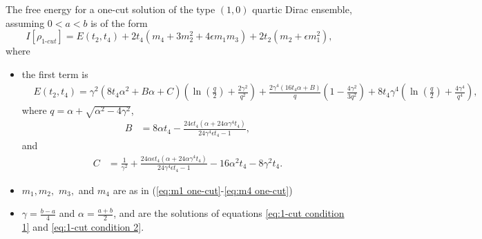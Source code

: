 \documentclass[10pt,a4paper]{amsart}
\begin{document}
\begin{prop}\label{free energy theorem}
 	The free energy for a one-cut solution of the type $(1,0)$ quartic Dirac ensemble, assuming $0<a<b$ is of the form 
 \begin{equation}
 I[\rho_{\textit{1-cut}}] = E(t_{2},t_{4}) +2t_{4}(m_{4} + 3 m_{2}^2 + 4 \epsilon m_{1}m_{3}) + 2t_{2}(m_{2}+ \epsilon m_{1}^2),
 \end{equation}
 where
 \begin{itemize}
 \item the first term is \begin{align*}&E(t_{2},t_{4})=
\gamma^2\left( 8 t_{4}\alpha^2+B\alpha+C\right)
\left(
\ln\left(\frac{q}{2}\right)+\frac{2\gamma^2}{q^2}
\right)
+
\frac{2\gamma^4(16 t_{4}\alpha+B)}{q}
\left(
1-\frac{4\gamma^2}{3q^2}
\right)
+
8 t_{4}\gamma^4
\left(
\ln\left(\frac{q}{2}\right)+\frac{4\gamma^4}{q^4}
\right),
 \end{align*}
 where $q = \alpha + \sqrt{\alpha^2 - 4 \gamma^2}$,
 \begin{align*}
 B& = 8 \alpha t_{4}-\frac{24 \epsilon t_{4} \left(\alpha +24 \alpha \gamma ^4 t_{4}\right)}{24 \gamma ^4 \epsilon
 t_{4}-1},
 \end{align*}
 and
 \begin{align*}
 C & = \frac{1}{\gamma ^2}+\frac{24 \alpha \epsilon t_{4} \left(\alpha +24 \alpha \gamma ^4 t_{4}\right)}{24 \gamma ^4
 \epsilon t_{4}-1}-16 \alpha ^2 t_{4}-8 \gamma ^2 t_{4}.
 \end{align*}
 \item $m_{1},m_{2},$ $m_{3},$ and $m_{4}$ are as in (\ref{eq:m1 one-cut}-\ref{eq:m4 one-cut}) 
 \item $\gamma = \frac{b-a}{4}$ and $\alpha=\frac{a+b}{2}$, and are the solutions of equations \eqref{eq:1-cut condition 1} and \eqref{eq:1-cut condition 2}.
 \end{itemize}
\end{prop}
\end{document}

